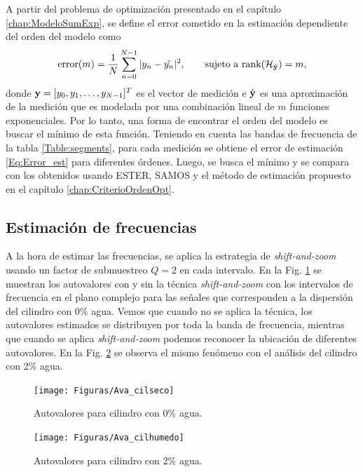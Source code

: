     A partir del problema de optimización presentado en el capítulo \ref{chap:ModeloSumExp}, se define el error cometido en la estimación dependiente del orden del modelo como
    \begin{equation}
        \mathrm{error}(m) = \frac{1}{N}\sum_{n=0}^{N-1}|y_n - \hat{y_n}|^2, \qquad \text{sujeto a } \mathrm{rank}(\mathcal{H}_{\hat{\mathbf{y}}}) = m,
        \label{Eq:Error_est}
    \end{equation}
    donde $\mathbf{y} = [y_0, y_1, \ldots, y_{N-1}]^T$ es el vector de medición e $\hat{\mathbf{y}}$ es una aproximación de la medición que es modelada por una combinación lineal de $m$ funciones exponenciales. Por lo tanto, una forma de encontrar el orden del modelo es buscar el mínimo de esta función. Teniendo en cuenta las bandas de frecuencia de la tabla \ref{Table:segments}, para cada medición se obtiene el error de estimación \eqref{Eq:Error_est} para diferentes órdenes. Luego, se busca el mínimo y se compara con los obtenidos usando ESTER, SAMOS y el método de estimación propuesto en el capítulo \ref{chap:CriterioOrdenOpt}. 



        
    \subsection{Estimación de frecuencias}
	    A la hora de estimar las frecuencias, se aplica la estrategia de \emph{shift-and-zoom} usando un factor de submuestreo $Q = 2$ en cada intervalo.
    En la Fig. \ref{Fig:Avas_cilSeco} se muestran los autovalores con y sin la técnica  \emph{shift-and-zoom} con los intervalos de frecuencia en el plano complejo para las señales que corresponden a la dispersión del cilindro con 0\% agua. Vemos que cuando no se aplica la técnica, los autovalores estimados se distribuyen por toda la banda de frecuencia, mientras que cuando se aplica \emph{shift-and-zoom} podemos reconocer la ubicación de diferentes autovalores. En la Fig. \ref{Fig:Avas_cilHumedo} se observa  el mismo fenómeno con el análisis del cilindro con 2\% agua.
	
	\begin{figure}[ht]
		\centering
		\centerline{\texttt{[image: Figuras/Ava\_cilseco]}}
		\caption{Autovalores para cilindro con $0\%$ agua.}
		\label{Fig:Avas_cilSeco}
	\end{figure}
	
	\begin{figure}[ht]
		\centering
		\centerline{\texttt{[image: Figuras/Ava\_cilhumedo]}}
		\caption{Autovalores para cilindro con $2\%$ agua.}
		\label{Fig:Avas_cilHumedo}
	\end{figure}		
	

